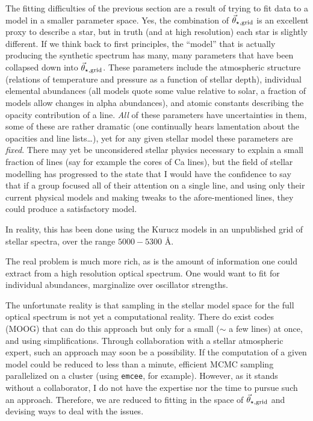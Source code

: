 \documentclass[preprint]{aastex} %
\newcommand{\vt}{\vec{\theta}}
\newcommand{\vg}{\vt_{\star, {\rm grid}}}
\begin{document}
The fitting difficulties of the previous section are a result of trying to fit data to a model in a smaller parameter space. Yes, the combination of $\vg$ is an excellent proxy to describe a star, but in truth (and at high resolution) each star is slightly different. If we think back to first principles, the ``model'' that is actually producing the synthetic spectrum has many, many parameters that have been collapsed down into $\vg$. These parameters include the atmospheric structure (relations of temperature and pressure as a function of stellar depth), individual elemental abundances (all models quote some value relative to solar, a fraction of models allow changes in alpha abundances), and atomic constants describing the opacity contribution of a line. \emph{All} of these parameters have uncertainties in them, some of these are rather dramatic (one continually hears lamentation about the opacities and line lists\dots), yet for any given stellar model these parameters are \emph{fixed}. There may yet be unconsidered stellar physics necessary to explain a small fraction of lines (say for example the cores of Ca lines), but the field of stellar modelling has progressed to the state that I would have the confidence to say that if a group focused all of their attention on a single line, and using only their current physical models and making tweaks to the afore-mentioned lines, they could produce a satisfactory model.

In reality, this has been done using the Kurucz models in an unpublished grid of stellar spectra, over the range $5000 - 5300$ \AA.

The real problem is much more rich, as is the amount of information one could extract from a high resolution optical spectrum. One would want to fit for individual abundances, marginalize over oscillator strengths. 

The unfortunate reality is that sampling in the stellar model space for the full optical spectrum is not yet a computational reality. There do exist codes (MOOG) that can do this approach but only for a small ($\sim$ a few lines) at once, and using simplifications. Through collaboration with a stellar atmospheric expert, such an approach may soon be a possibility. If the computation of a given model could be reduced to less than a minute, efficient MCMC sampling parallelized on a cluster (using \texttt{emcee}, for example). However, as it stands without a collaborator, I do not have the expertise nor the time to pursue such an approach. Therefore, we are reduced to fitting in the space of $\vg$ and devising ways to deal with the issues.
\end{document}
